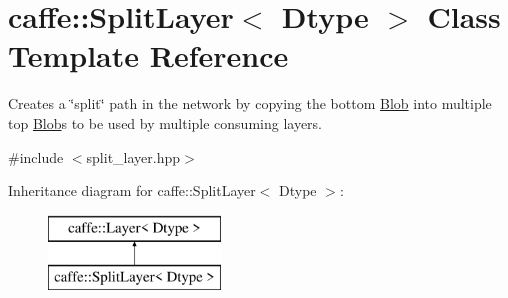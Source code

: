 \hypertarget{classcaffe_1_1SplitLayer}{}\section{caffe\+:\+:Split\+Layer$<$ Dtype $>$ Class Template Reference}
\label{classcaffe_1_1SplitLayer}


Creates a \char`\"{}split\char`\"{} path in the network by copying the bottom \hyperlink{classcaffe_1_1Blob}{Blob} into multiple top \hyperlink{classcaffe_1_1Blob}{Blob}s to be used by multiple consuming layers.  




{\ttfamily \#include $<$split\+\_\+layer.\+hpp$>$}

Inheritance diagram for caffe\+:\+:Split\+Layer$<$ Dtype $>$\+:\begin{figure}[H]
\begin{center}
\leavevmode
\includegraphics[height=2.000000cm]{classcaffe_1_1SplitLayer}
\end{center}
\end{figure}

